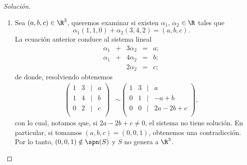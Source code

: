 \documentclass[a4,11pt]{aleph-notas}
\begin{document}
\begin{proof}[Solución]\hspace{0pt}
    \begin{enumerate}
        \item Sea $(a, b, c) \in \R^3$, queremos examinar si existen $\alpha_1$, $\alpha_2$ $\in \R$ tales que  
        \[
        \alpha_{1} (1, 1, 0) + \alpha_{2} (3, 4, 2) =(a, b, c).
        \]
        La ecuación anterior conduce al sistema lineal
        \[
        \begin{array}{rrrrrrr}
         \alpha _{1} & + & 3\alpha_{2} & = & a; \\
         \alpha _{1} & + & 4\alpha_{2} & = & b;\\
         & & 2\alpha_{2} & = & c;
         \end{array}
         \]
         de donde, resolviendo obtenemos
         \begin{align*}
        \begin{pmatrix}
            1&3&|&a\\
            1&4&|&b\\
            0&2&|&c\\
        \end{pmatrix}
        & \sim 
        \begin{pmatrix}
            1&3&|&a\\
            0&1&|&-a+b\\
            0&0&|&2a - 2b +c\\
        \end{pmatrix},
        \end{align*}
        con lo cual, notamos que, si $2a - 2b + c \neq 0$, el sistema no tiene solución. En particular, si tomamos $(a,b,c)=(0,0,1)$, obtenemos una contradicción. Por lo tanto, $(0,0,1)\notin \spn(S)$ y $S$ no genera a $\R^3$.
        

\end{enumerate}
\end{proof}
\end{document}
